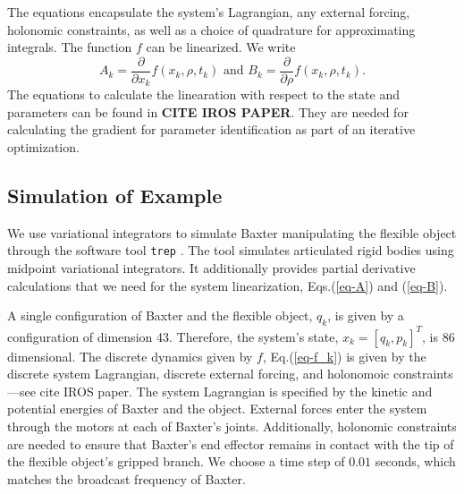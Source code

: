 \documentclass[runningheads,a4paper]{llncs}
\begin{document}
The equations encapsulate the system's Lagrangian, any external forcing, holonomic constraints, as well as a choice of quadrature for approximating integrals.  The function $f$ can be linearized. We write 
\begin{equation}
A_k = \frac{\partial}{\partial x_k}f(x_k,\rho,t_k) \textrm{ and } B_k = \frac{\partial}{\partial \rho}f(x_k,\rho,t_k).
\label{eq-lin_fk}
\end{equation}
The equations to calculate the linearation with respect to the state and parameters can be found in \textbf{CITE IROS PAPER}. They are needed for calculating the gradient for parameter identification as part of an iterative optimization.

\subsection{Simulation of Example}
We use variational integrators to simulate Baxter manipulating the flexible object through the software tool \texttt{trep} \cite{johnson_murphey_scalable}.  The tool simulates articulated rigid bodies using midpoint variational integrators.  It additionally provides partial derivative calculations that we need for the system linearization, Eqs.(\ref{eq-A}) and (\ref{eq-B}). 

A single configuration of Baxter and the flexible object, $q_k$, is given by a configuration of dimension 43. Therefore, the system's state,  $x_k = [q_k,p_k]^T$, is 86 dimensional. The discrete dynamics given by $f$, Eq.(\ref{eq-f_k}) is given by the discrete system Lagrangian, discrete external forcing, and holonomoic constraints---see cite IROS paper.  The system Lagrangian is specified by the kinetic and potential energies of Baxter and the object.  External forces enter the system through the motors at each of Baxter's joints.  Additionally, holonomic constraints are needed to ensure that Baxter's end effector remains in contact with the tip of the flexible object's gripped branch.  We choose a time step of $0.01$ seconds, which matches the broadcast frequency of Baxter. 
\end{document}
